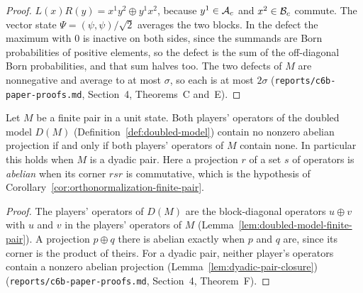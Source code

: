 \begin{proof}
\leanok
$L(x) R(y) = x^1 y^2 \oplus y^1 x^2$, because $y^1 \in \cal{A}_c$ and $x^2 \in \cal{B}_c$ commute.
The vector state $\Psi = (\psi, \psi)/\sqrt{2}$ averages the two blocks. In the defect the
maximum with $0$ is inactive on both sides, since the summands are Born probabilities of positive
elements, so the defect is the sum of the off-diagonal Born probabilities, and that sum halves too.
The two defects of $M$ are nonnegative and average to at most $\sigma$, so each is at most
$2\sigma$ (\texttt{reports/c6b-paper-proofs.md}, Section~4, Theorems~C and~E).
\end{proof}

\begin{lemma}
\label{lem:doubled-model-no-abelian}
\leanok
Let $M$ be a finite pair in a unit state. Both players' operators of the doubled model $D(M)$
(Definition~\ref{def:doubled-model}) contain no nonzero abelian projection if and only if both
players' operators of $M$ contain none. In particular this holds when $M$ is a dyadic pair. Here
a projection $r$ of a set $s$ of operators is \emph{abelian} when its corner $r s r$ is
commutative, which is the hypothesis of
Corollary~\ref{cor:orthonormalization-finite-pair}.
\end{lemma}

\begin{proof}
\leanok
The players' operators of $D(M)$ are the block-diagonal operators $u \oplus v$ with $u$ and $v$ in
the players' operators of $M$ (Lemma~\ref{lem:doubled-model-finite-pair}). A projection $p \oplus q$
there is abelian exactly when $p$ and $q$ are, since its corner is the product of theirs. For a
dyadic pair, neither player's operators contain a nonzero abelian projection
(Lemma~\ref{lem:dyadic-pair-closure}) (\texttt{reports/c6b-paper-proofs.md}, Section~4,
Theorem~F).
\end{proof}

